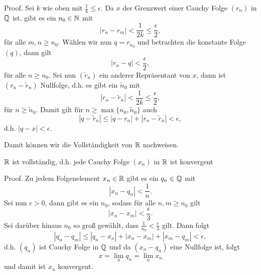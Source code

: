 \begin{emphBox}{}{}
Proof.  Sei \(k\) wie oben mit \(\frac{1}k \leq \epsilon\). Da \(x\) der Grenzwert einer Cauchy Folge \((r_n)\) in \(\mathbb{Q}\) ist, gibt es ein \(n_0 \in \mathbb{N}\) mit
\begin{equation*}
|r_n - r_m| < \frac{1}{2k} \leq \frac{\epsilon}2,
\end{equation*}
für alle \(m,n \geq n_0\). Wählen wir nun \(q=r_{n_0}\) und betrachten die konstante Folge \((q)\), dann gilt
\begin{equation*}
|r_n - q| <  \frac{\epsilon}2,
\end{equation*}
für alle \(n \geq n_0\). Sei nun \((\tilde r_n)\) ein anderer Repräsentant von \(x\), dann ist \((r_n - \tilde r_n)\) Nullfolge, d.h. es gibt ein \(\tilde n_0\) mit
\begin{equation*}
|r_n - \tilde r_n|   < \frac{1}{2k} \leq \frac{\epsilon}2,
\end{equation*}
für \(n \geq \tilde n_0\). Damit gilt für \(n\geq \max\{n_0,\tilde n_0\}\) auch
\begin{equation*}
|q-\tilde r_n| \leq |q -r_n|+|r_n - \tilde r_n| < \epsilon,
\end{equation*}
d.h. \(|q-x| < \epsilon\).
\end{emphBox}

Damit können wir die Vollständigkeit von \(\mathbb{R}\) nachweisen.
\label{grundlagen/zahlensysteme:theorem-24}
\begin{theorem}{}{}



\(\mathbb{R}\) ist vollständig, d.h. jede Cauchy Folge \((x_n)\) in \(\mathbb{R}\) ist konvergent
\end{theorem}

\begin{emphBox}{}{}
Proof.  Zu jedem Folgenelement \(x_n \in \mathbb{R}\) gibt es ein \(q_n \in \mathbb{Q}\) mit
\begin{equation*}
|x_n-q_n| < \frac{1}n.
\end{equation*}
Sei nun \(\epsilon > 0\), dann gibt es ein \(n_0\), sodass für alle \(n,m \geq n_0\) gilt
\begin{equation*}
|x_n - x_m| < \frac{\epsilon}3.
\end{equation*}
Sei darüber hinaus \(n_0\) so groß gewählt, dass \(\frac{1}{n_0} < \frac{\epsilon}3\) gilt. Dann folgt
\begin{equation*}
|q_n - q_m| \leq |q_n - x_n| + |x_n - x_m| + |x_m-q_m| <\epsilon,
\end{equation*}
d.h. \((q_n)\) ist Cauchy Folge in \(\mathbb{Q}\) und da \((x_n -q_n)\) eine Nullfolge ist, folgt
\begin{equation*}
 x=\lim_n q_n = \lim_n x_n
\end{equation*}
und damit ist \(x_n\) konvergent.
\end{emphBox}

